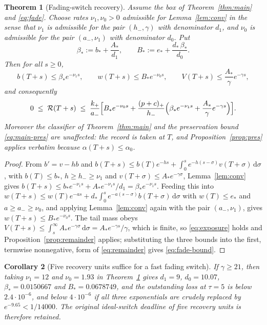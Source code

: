 \documentclass[11pt]{article}
\newtheorem{theorem}{Theorem}[section]
\newtheorem{corollary}[theorem]{Corollary}
\theoremstyle{definition}
\theoremstyle{remark}
\newcommand{\dd}{\,\mathrm{d}}
\newcommand{\Rem}{\mathcal{R}}
\begin{document}
\begin{theorem}[Fading-switch recovery]\label{thm:fade}
Assume the box of Theorem~\ref{thm:main} and \eqref{eq:fade}. Choose rates
$\nu_1,\nu_0>0$ admissible for Lemma~\ref{lem:conv} in the sense that
$\nu_1$ is admissible for the pair $(h_-,\gamma)$ with denominator $d_1$, and
$\nu_0$ is admissible for the pair $(a_-,\nu_1)$ with denominator $d_0$. Put
\[
\beta_*:=b_*+\frac{A_*}{d_1},\qquad
B_*:=e_*+\frac{d_*\,\beta_*}{d_0}.
\]
Then for all $s\ge0$,
\[
b(T+s)\le\beta_*e^{-\nu_1s},\qquad
w(T+s)\le B_*e^{-\nu_0s},\qquad
V(T+s)\le\frac{A_*}{\gamma}e^{-\gamma s},
\]
and consequently
\begin{equation}
0\;\le\;\Rem(T+s)\;\le\;\frac{k_+}{a_-}\Bigl[
B_*e^{-\nu_0s}
+\frac{(p+c)_+}{h_-}\Bigl(\beta_*e^{-\nu_1s}+\frac{A_*}{\gamma}e^{-\gamma s}\Bigr)
\Bigr].
\label{eq:fade-bound}
\end{equation}
Moreover the classifier of Theorem~\ref{thm:main} and the preservation bound
\eqref{eq:main-pres} are unaffected: the record is taken at $T$, and
Proposition~\ref{prop:pres} applies verbatim because $\alpha(T+s)\le\alpha_0$.
\end{theorem}

\begin{proof}
From $b'=v-hb$ and $b(T+s)\le b(T)e^{-hs}+\int_0^se^{-h(s-\sigma)}v(T+\sigma)
\dd\sigma$, with $b(T)\le b_*$, $h\ge h_-\ge\nu_1$ and $v(T+\sigma)\le
A_*e^{-\gamma\sigma}$, Lemma~\ref{lem:conv} gives
$b(T+s)\le b_*e^{-\nu_1s}+A_*e^{-\nu_1s}/d_1=\beta_*e^{-\nu_1s}$. Feeding this
into $w(T+s)\le w(T)e^{-as}+d_*\int_0^se^{-a(s-\sigma)}b(T+\sigma)\dd\sigma$
with $w(T)\le e_*$ and $a\ge a_-\ge\nu_0$, and applying Lemma~\ref{lem:conv}
again with the pair $(a_-,\nu_1)$, gives $w(T+s)\le B_*e^{-\nu_0s}$. The tail
mass obeys $V(T+s)\le\int_s^\infty A_*e^{-\gamma\sigma}\dd\sigma
=A_*e^{-\gamma s}/\gamma$, which is finite, so \eqref{eq:exposure} holds and
Proposition~\ref{prop:remainder} applies; substituting the three bounds into the
first, termwise nonnegative, form of \eqref{eq:remainder} gives
\eqref{eq:fade-bound}.
\end{proof}

\begin{corollary}[Five recovery units suffice for a fast fading switch]
\label{cor:fast-fade}
If $\gamma\ge21$, then taking $\nu_1=12$ and $\nu_0=1.93$ in
Theorem~\ref{thm:fade} gives $d_1=9$, $d_0=10.07$,
$\beta_*=0.0150667$ and $B_*=0.0678749$, and the outstanding loss at $\tau=5$
is below $2.4\cdot10^{-6}$, and below $4\cdot10^{-6}$ if all three exponentials
are crudely replaced by $e^{-9.65}<1/14000$. The original ideal-switch deadline
of five recovery units is therefore retained.
\end{corollary}
\end{document}
